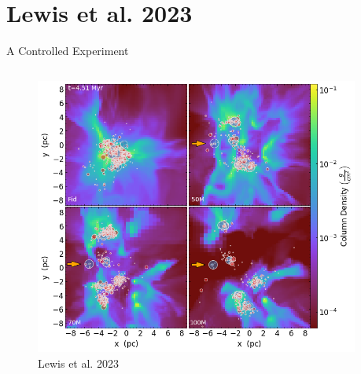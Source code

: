 \documentclass[aspectratio=169]{beamer}
\begin{document}
\section{Lewis et al. 2023}
\begin{frame}{A Controlled Experiment}{}
    \begin{columns}
        \begin{column}{0.45\textwidth}
            \begin{figure}[h!]
                \centering
                \includegraphics[width=\linewidth]{../images/density_grid.png} \\
                Lewis et al. 2023
                \label{fig:density}
            \end{figure}
        \end{column}
        \begin{column}{0.35\textwidth}
            

\end{column}
\end{columns}
\end{frame}
\end{document}
